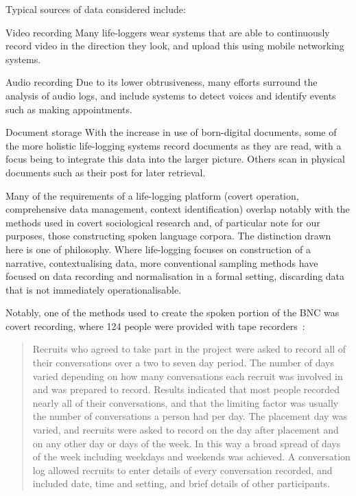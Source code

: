 Typical sources of data considered include:

\begin{itemizeTitle}
    \item[Video recording] Many life-loggers wear systems that are able to continuously record video in the direction they look, and upload this using mobile networking systems.
    \item[Audio recording] Due to its lower obtrusiveness, many efforts surround the analysis of audio logs, and include systems to detect voices and identify events such as making appointments.
    \item[Document storage] With the increase in use of born-digital documents, some of the more holistic life-logging systems record documents as they are read, with a focus being to integrate this data into the larger picture.  Others scan in physical documents such as their post for later retrieval.
\end{itemizeTitle}

Many of the requirements of a life-logging platform (covert operation, comprehensive data management, context identification) overlap notably with the methods used in covert sociological research and, of particular note for our purposes, those constructing spoken language corpora.  The distinction drawn here is one of philosophy.  Where life-logging focuses on construction of a narrative, contextualising data, more conventional sampling methods have focused on data recording and normalisation in a formal setting, discarding data that is not immediately operationalisable.


Notably, one of the methods used to create the spoken portion of the BNC was covert recording, where 124 people were provided with tape recorders~\cite{burnard1995users}:
\begin{quote}
Recruits who agreed to take part in the project were asked to record all of their conversations over a two to seven day period. The number of days varied depending on how many conversations each recruit was involved in and was prepared to record. Results indicated that most people recorded nearly all of their conversations, and that the limiting factor was usually the number of conversations a person had per day. The placement day was varied, and recruits were asked to record on the day after placement and on any other day or days of the week. In this way a broad spread of days of the week including weekdays and weekends was achieved. A conversation log allowed recruits to enter details of every conversation recorded, and included date, time and setting, and brief details of other participants.
\end{quote}

